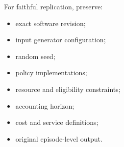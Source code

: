 \documentclass[10pt,a4paper]{article}
\theoremstyle{plain}
\theoremstyle{definition}
\theoremstyle{remark}
\begin{document}
For faithful replication, preserve:

\begin{itemize}[leftmargin=18pt,itemsep=2pt]
\item exact software revision;
\item input generator configuration;
\item random seed;
\item policy implementations;
\item resource and eligibility constraints;
\item accounting horizon;
\item cost and service definitions;
\item original episode-level output.
\end{itemize}

\end{document}
